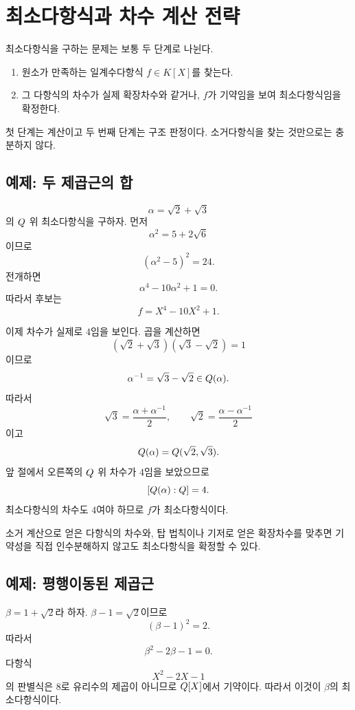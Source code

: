 \section{최소다항식과 차수 계산 전략}
\label{sec:minimal-polynomial-strategy}

최소다항식을 구하는 문제는 보통 두 단계로 나뉜다.

\begin{enumerate}
  \item 원소가 만족하는 일계수다항식 $f\in K[X]$를 찾는다.
  \item 그 다항식의 차수가 실제 확장차수와 같거나, $f$가 기약임을 보여 최소다항식임을 확정한다.
\end{enumerate}

첫 단계는 계산이고 두 번째 단계는 구조 판정이다. 소거다항식을 찾는 것만으로는 충분하지 않다.

\subsection{예제: 두 제곱근의 합}

\begin{example}
\[
  \alpha=\sqrt2+\sqrt3
\]
의 $Q$ 위 최소다항식을 구하자. 먼저
\[
  \alpha^2=5+2\sqrt6
\]
이므로
\[
  (\alpha^2-5)^2=24.
\]
전개하면
\[
  \alpha^4-10\alpha^2+1=0.
\]
따라서 후보는
\[
  f=X^4-10X^2+1.
\]

이제 차수가 실제로 $4$임을 보인다. 곱을 계산하면
\[
  (\sqrt2+\sqrt3)(\sqrt3-\sqrt2)=1
\]
이므로
\[
  \alpha^{-1}=\sqrt3-\sqrt2\in Q(\alpha).
\]
따라서
\[
  \sqrt3=\frac{\alpha+\alpha^{-1}}2,
  \qquad
  \sqrt2=\frac{\alpha-\alpha^{-1}}2
\]
이고
\[
  Q(\alpha)=Q(\sqrt2,\sqrt3).
\]
앞 절에서 오른쪽의 $Q$ 위 차수가 $4$임을 보았으므로
\[
  [Q(\alpha):Q]=4.
\]
최소다항식의 차수도 $4$여야 하므로 $f$가 최소다항식이다.
\end{example}

\begin{keyidea}
소거 계산으로 얻은 다항식의 차수와, 탑 법칙이나 기저로 얻은 확장차수를 맞추면 기약성을 직접 인수분해하지 않고도 최소다항식을 확정할 수 있다.
\end{keyidea}

\subsection{예제: 평행이동된 제곱근}

\begin{example}
$\beta=1+\sqrt2$라 하자. $\beta-1=\sqrt2$이므로
\[
  (\beta-1)^2=2.
\]
따라서
\[
  \beta^2-2\beta-1=0.
\]
다항식
\[
  X^2-2X-1
\]
의 판별식은 $8$로 유리수의 제곱이 아니므로 $Q[X]$에서 기약이다. 따라서 이것이 $\beta$의 최소다항식이다.
\end{example}

